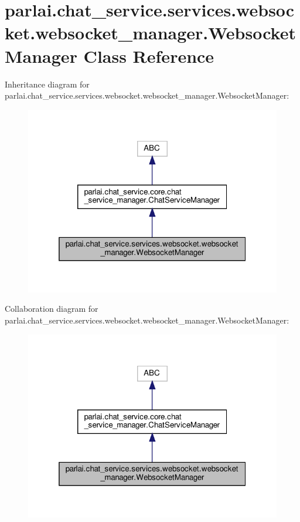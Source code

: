 \hypertarget{classparlai_1_1chat__service_1_1services_1_1websocket_1_1websocket__manager_1_1WebsocketManager}{}\section{parlai.\+chat\+\_\+service.\+services.\+websocket.\+websocket\+\_\+manager.\+Websocket\+Manager Class Reference}
\label{classparlai_1_1chat__service_1_1services_1_1websocket_1_1websocket__manager_1_1WebsocketManager}


Inheritance diagram for parlai.\+chat\+\_\+service.\+services.\+websocket.\+websocket\+\_\+manager.\+Websocket\+Manager\+:
\nopagebreak
\begin{figure}[H]
\begin{center}
\leavevmode
\includegraphics[width=319pt]{classparlai_1_1chat__service_1_1services_1_1websocket_1_1websocket__manager_1_1WebsocketManager__inherit__graph}
\end{center}
\end{figure}


Collaboration diagram for parlai.\+chat\+\_\+service.\+services.\+websocket.\+websocket\+\_\+manager.\+Websocket\+Manager\+:
\nopagebreak
\begin{figure}[H]
\begin{center}
\leavevmode
\includegraphics[width=319pt]{classparlai_1_1chat__service_1_1services_1_1websocket_1_1websocket__manager_1_1WebsocketManager__coll__graph}
\end{center}
\end{figure}
